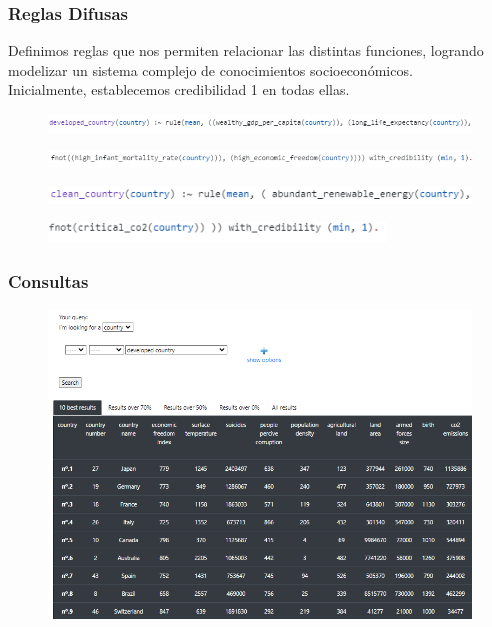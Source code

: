 \documentclass{beamer}
\newcommand{\slideauthor}[1]{\def\insertslideauthor{#1}}
\newcommand{\insertslideauthor}{}
\begin{document}
\begin{frame}
\frametitle{Reglas Difusas}
\slideauthor{Javier Comyn}
Definimos reglas que nos permiten relacionar las distintas funciones, logrando modelizar un sistema complejo de conocimientos socioeconómicos.\\
Inicialmente, establecemos credibilidad 1 en todas ellas.
\vspace*{+5mm}
\begin{figure}
\includegraphics[width=\textwidth]{Images/developed_1.png} 
\end{figure}
\vspace*{-5mm} %
\begin{figure}
\includegraphics[width=\textwidth]{Images/developed_2.png} 
\end{figure}
\begin{figure}
\includegraphics[width=\textwidth]{Images/clean_1.png} 
\end{figure}
\vspace*{-5mm} %
\begin{figure}
\includegraphics[width=0.8\textwidth]{Images/clean_2.png} 
\end{figure}
\end{frame}

\begin{frame}
\frametitle{Consultas}
\slideauthor{Javier Comyn}
\begin{figure}
\includegraphics[width=\textwidth]{Images/developed_country (1).png} 
\end{figure}
\end{frame}
\end{document}
